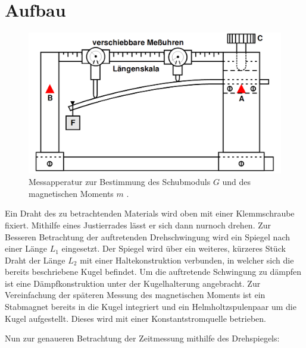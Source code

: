 \section{Aufbau}
\label{sec:Aufbau}

\begin{figure}[H]
         \centering
         \includegraphics[width=\linewidth-150pt,height=\textheight-150pt,keepaspectratio]{content/Bilder/Aufbau.png}
         \caption{Messapperatur zur Bestimmung des Schubmoduls $G$ und des magnetischen Moments $m$ \cite{V102}.}
         \label{fig:Aufbau}
       \end{figure}

        Ein Draht des zu betrachtenden Materials wird oben mit einer Klemmschraube fixiert. Mithilfe eines
           Justierrades lässt er sich dann nurnoch drehen. Zur Besseren
            Betrachtung der auftretenden Drehschwingung wird ein Spiegel nach einer Länge $L_1$ eingesetzt. Der
             Spiegel wird über ein weiteres, kürzeres Stück Draht der Länge $L_2$ mit
             einer Haltekonstruktion verbunden, in welcher sich die bereits
              beschriebene Kugel befindet.
               Um die auftretende Schwingung zu dämpfen ist eine Dämpfkonstruktion
                unter der Kugelhalterung angebracht. Zur Vereinfachung der späteren Messung des magnetischen Moments ist ein Stabmagnet
               bereits in die Kugel integriert und ein Helmholtzspulenpaar um die Kugel aufgestellt. Dieses wird
                 mit einer Konstantstromquelle betrieben.

                 Nun zur genaueren Betrachtung der Zeitmessung mithilfe des Drehspiegels:

